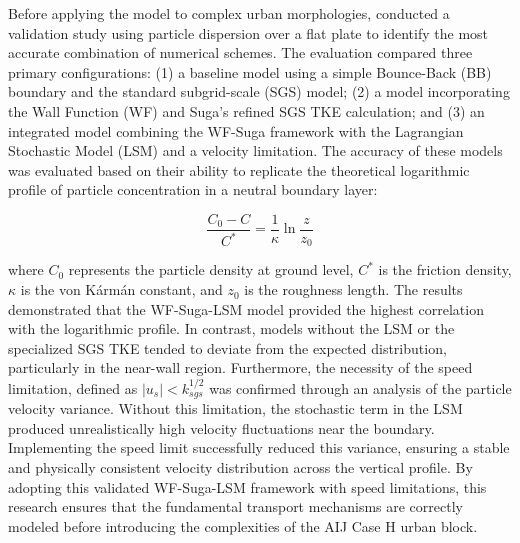 Before applying the model to complex urban morphologies, \textcite{Yokouchi2020Simulation} conducted a validation study using particle dispersion over a flat plate to identify the most accurate combination of numerical schemes. The evaluation compared three primary configurations: (1) a baseline model using a simple Bounce-Back (BB) boundary and the standard subgrid-scale (SGS) model; (2) a model incorporating the Wall Function (WF) and Suga's refined SGS TKE calculation; and (3) an integrated model combining the WF-Suga framework with the Lagrangian Stochastic Model (LSM) and a velocity limitation. The accuracy of these models was evaluated based on their ability to replicate the theoretical logarithmic profile of particle concentration in a neutral boundary layer:

\begin{equation}
    \frac{C_0 - C}{C^*} = \frac{1}{\kappa} \ln \frac{z}{z_0}    
\end{equation}

where $C_0$ represents the particle density at ground level, $C^*$ is the friction density, $\kappa$ is the von Kármán constant, and $z_0$ is the roughness length. The results demonstrated that the WF-Suga-LSM model provided the highest correlation with the logarithmic profile. In contrast, models without the LSM or the specialized SGS TKE tended to deviate from the expected distribution, particularly in the near-wall region. Furthermore, the necessity of the speed limitation, defined as $|u_s| < k_{sgs}^{1/2}$ was confirmed through an analysis of the particle velocity variance. Without this limitation, the stochastic term in the LSM produced unrealistically high velocity fluctuations near the boundary. Implementing the speed limit successfully reduced this variance, ensuring a stable and physically consistent velocity distribution across the vertical profile. By adopting this validated WF-Suga-LSM framework with speed limitations, this research ensures that the fundamental transport mechanisms are correctly modeled before introducing the complexities of the AIJ Case H urban block.



